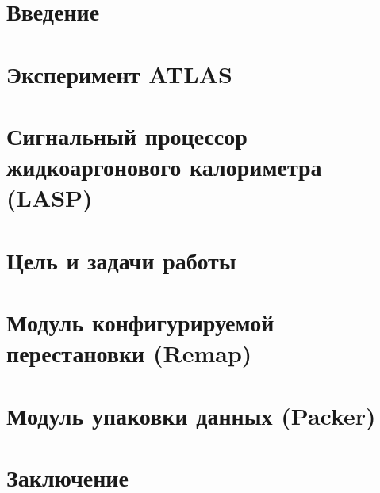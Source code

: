 \documentclass[a4paper, 14pt]{extarticle}
\begin{document}


\tableofcontents
\thispagestyle{empty}
\newpage

\setcounter{page}{3}
\section*{Введение}
    
    \newpage

\section{Эксперимент ATLAS}
    
    \newpage

\section{Сигнальный процессор жидкоаргонового калориметра (LASP)}
    
    \newpage

\section{Цель и задачи работы}
    
    \newpage

\section{Модуль конфигурируемой перестановки (Remap)}
    
    \newpage

\section{Модуль упаковки данных (Packer)}
    
\newpage

\section*{Заключение}
    
    \newpage

%
\printbibliography

\end{document}
